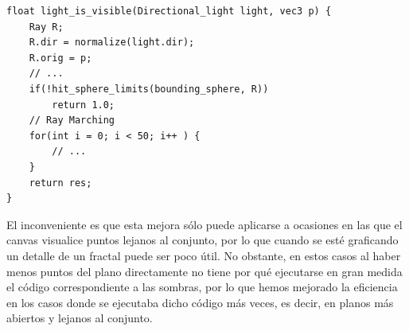 \begin{lstlisting}
float light_is_visible(Directional_light light, vec3 p) {
    Ray R;
    R.dir = normalize(light.dir);
    R.orig = p;
    // ... 
    if(!hit_sphere_limits(bounding_sphere, R))
        return 1.0;
    // Ray Marching
    for(int i = 0; i < 50; i++ ) {
        // ... 
    }
    return res;
}
\end{lstlisting}

El inconveniente es que esta mejora sólo puede aplicarse a ocasiones en las que el canvas visualice puntos lejanos al conjunto, por lo que cuando se esté graficando un detalle de un fractal puede ser poco útil. No obstante, en estos casos al haber menos puntos del plano directamente no tiene por qué ejecutarse en gran medida el código correspondiente a las sombras, por lo que hemos mejorado la eficiencia en los casos donde se ejecutaba dicho código más veces, es decir, en planos más abiertos y lejanos al conjunto.

